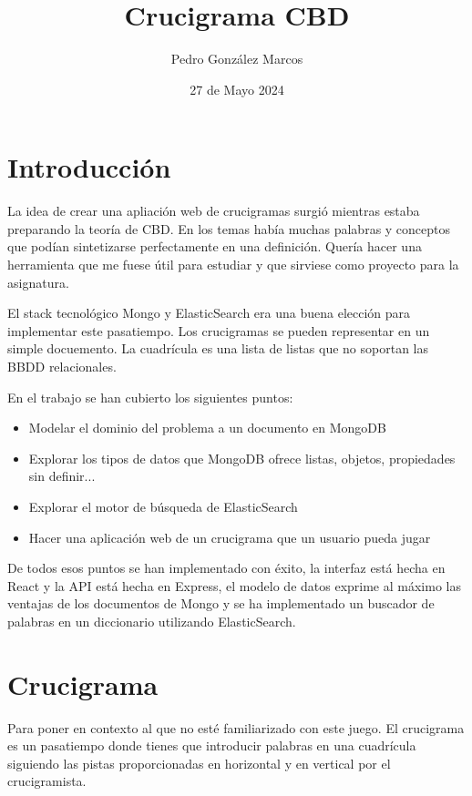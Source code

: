 \documentclass[12pt, a4paper]{article}
\title{Crucigrama CBD}
\author{Pedro González Marcos}
\date{27 de Mayo 2024}
\begin{document}
\maketitle

\tableofcontents

\section{Introducción}

La idea de crear una apliación web de crucigramas surgió mientras estaba preparando la teoría de
CBD. En los temas había muchas palabras y conceptos que podían sintetizarse perfectamente
en una definición. Quería hacer una herramienta que me fuese útil para estudiar y que sirviese
como proyecto para la asignatura.

El stack tecnológico Mongo y ElasticSearch era una buena elección para implementar este
pasatiempo. Los crucigramas se pueden representar en un simple docuemento. La cuadrícula es una
lista de listas que no soportan las BBDD relacionales. 

En el trabajo se han cubierto los siguientes puntos:

\begin{itemize}
	\item Modelar el dominio del problema a un documento en MongoDB
	\item Explorar los tipos de datos que MongoDB ofrece listas, objetos, propiedades sin definir...
	\item Explorar el motor de búsqueda de ElasticSearch
	\item Hacer una aplicación web de un crucigrama que un usuario pueda jugar
\end{itemize}

De todos esos puntos se han implementado con éxito, la interfaz está hecha en React
y la API está hecha en Express, el modelo de datos exprime al máximo las ventajas de
los documentos de Mongo y se ha implementado un buscador de palabras en un diccionario
utilizando ElasticSearch.

\section{Crucigrama}

Para poner en contexto al que no esté familiarizado con este juego.
El crucigrama es un pasatiempo donde tienes que introducir palabras
en una cuadrícula siguiendo las pistas proporcionadas en horizontal y en
vertical por el crucigramista.
\end{document}
